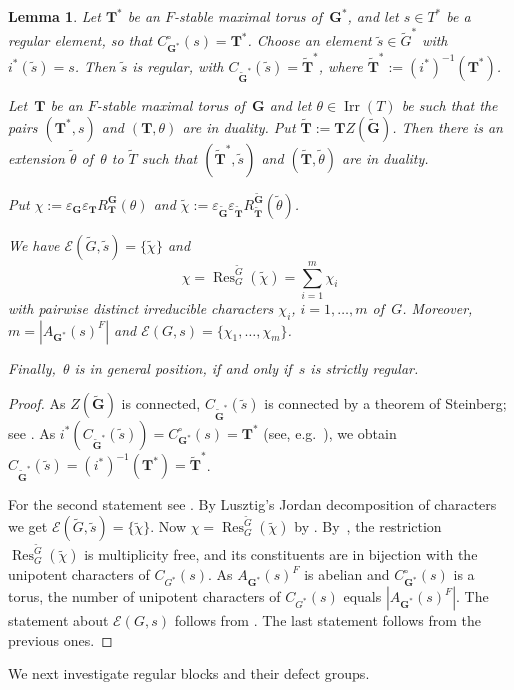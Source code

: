 \documentclass[12pt]{amsart}
\newcommand{\bG}{{\mathbf{G}}}      %
\newcommand{\bT}{{\mathbf{T}}}
\DeclareMathOperator{\Res}{Res}               %
\DeclareMathOperator{\Irr}{Irr}
\newtheorem{lem}[thm]{Lemma}
\theoremstyle{theorem}
\theoremstyle{definition}
\theoremstyle{remark}
\begin{document}
\begin{lem}
\label{RegularElementsAndRegularEmbeddings}
Let $\bT^*$ be an $F$-stable maximal torus of~$\bG^*$, and let $s \in T^*$ be a 
regular element, so that $C^{\circ}_{\bG^*}( s ) = \bT^*$. Choose an element 
$\tilde{s} \in \tilde{G}^*$ with $i^*( \tilde{s} ) = s$. Then $\tilde{s}$ is 
regular, with $C_{\tilde{\bG}^*}( \tilde{s} ) = \tilde{\bT}^*$,
where $\tilde{\bT}^* := {(i^*)}^{-1}( \bT^* )$.

Let~$\bT$ be an $F$-stable maximal torus of~$\bG$ and let $\theta \in \Irr(T)$ 
be such that the pairs $(\bT^*,s)$ and $(\bT, \theta)$ are in duality. Put 
$\tilde{\bT} := \bT Z( \tilde{\bG} )$. Then there is an extension
$\tilde{\theta}$ of~$\theta$ to $\tilde{T}$ such that 
$(\tilde{\bT}^*, \tilde{s} )$ and $(\tilde{\bT}, \tilde{\theta})$ are in 
duality.

Put $\chi :=
\varepsilon_{\bG}\varepsilon_{\bT}R_{\bT}^{\bG}( \theta )$ and
$\tilde{\chi} := 
\varepsilon_{\tilde{\bG}}\varepsilon_{\tilde{\bT}}
R_{\tilde{\bT}}^{\tilde{\bG}}( \tilde{\theta} )$.

We have $\mathcal{E}( \tilde{G}, \tilde{s} ) = \{ \tilde{ \chi } \}$ 
and
$$\chi = \Res^{\tilde{G}}_{G}( \tilde{ \chi } ) = \sum_{i=1}^{m} \chi_i$$
with pairwise distinct irreducible characters $\chi_i$, $i = 1, \ldots , m$ 
of~$G$. Moreover, $m = |A_{\bG^*}( s )^F|$ and
$\mathcal{E}( G, s ) = \{ \chi_1, \ldots , \chi_m \}$.

Finally,~$\theta$ is in general position, if and only if~$s$ is strictly 
regular.
\end{lem}
\begin{proof}
As $Z( \tilde{\bG} )$ is connected, $C_{\tilde{\bG}^*}( \tilde{s} )$ is 
connected by a theorem of Steinberg; see \cite[Theorem~$4.5.9$]{C2}.
As $i^*( C_{\tilde{\bG}^*}( \tilde{s} ) ) = C^{\circ}_{\bG^*}( s ) = \bT^*$ 
(see, e.g.\ \cite[p.~$36$]{CeBo2}), we obtain $C_{\tilde{\bG}^*}( \tilde{s} ) 
= {(i^*)}^{-1}( \bT^* ) = \tilde{\bT}^*$.

For the second statement see \cite[Lemme~$9.3$(b)]{CeBo2}. By Lusztig's Jordan
decomposition of characters we get $\mathcal{E}( \tilde{G}, \tilde{s} ) = 
\{ \tilde{\chi} \}$. Now $\chi = \Res^{\tilde{G}}_G( \tilde{\chi} )$ by
\cite[Proposition~$10.10$]{CeBo2}. By~\cite[Section~$10$]{Lu}, the
restriction $\Res^{\tilde{G}}_G( \tilde{\chi} )$ is multiplicity free, and its
constituents are in bijection with the unipotent characters of $C_{G^*}( s )$.
As $A_{\bG^*}( s )^F$ is abelian and $C^{\circ}_{\bG^*}( s )$ is a torus, the 
number of unipotent characters of $C_{G^*}( s )$ equals $|A_{\bG^*}( s )^F|$. 
The statement about $\mathcal{E}( G, s )$ follows from 
\cite[Proposition~$11.7$]{CeBo2}.  The last statement follows from the previous 
ones.
\end{proof}
We next investigate regular blocks and their defect groups.
\end{document}
